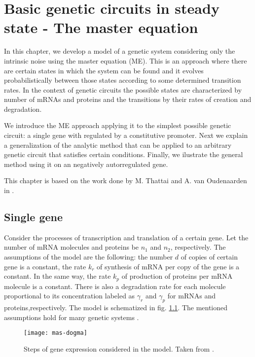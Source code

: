 \chapter{Basic genetic circuits in steady state - The master equation}
\label{ch:master}

In this chapter, we develop a model of a genetic system considering only the intrinsic noise using the master equation (ME). This is an approach where there are certain states in which the system can be found and it evolves probabilistically between those states according to some determined transition rates. In the context of genetic circuits the possible states are characterized by number of mRNAs and proteins and the transitions by their rates of creation and degradation.

We introduce the ME approach applying it to the simplest possible genetic circuit: a single gene with regulated by a constitutive promoter. Next we explain a generalization of the analytic method that can be applied to an arbitrary genetic circuit that satisfies certain conditions. Finally, we ilustrate the general method using it on an negatively autorregulated gene.

This chapter is based on the work done by M. Thattai and A. van Oudenaarden in \cite{thattai01}.

\section{Single gene}
\label{sec:mas-single_gene}
Consider the processes of transcription and translation of a certain gene. Let the number of mRNA molecules and proteins be $n_1$ and $n_2$, respectively. The assumptions of the model are the following: the number $d$ of copies of certain gene is a constant, the rate $k_r$ of synthesis of mRNA per copy of the gene is a constant. In the same way, the rate $k_p$ of production of proteins per mRNA molecule is a constant. There is also a degradation rate for each molecule proportional to its concentration labeled as $\gamma_r$ and $\gamma_p$ for mRNAs and proteins,respectively. The model is schematized in fig. \ref{fig:mas-dogma}. The mentioned assumptions hold for many genetic systems \cite{thattai01}.

\begin{figure}[H]
  \centering
  \texttt{[image: mas-dogma]}
  \caption[Model of gene expression for a single gene]{\label{fig:mas-dogma} Steps of gene expression considered in the model. Taken from \cite{thattai01}.}
\end{figure}

